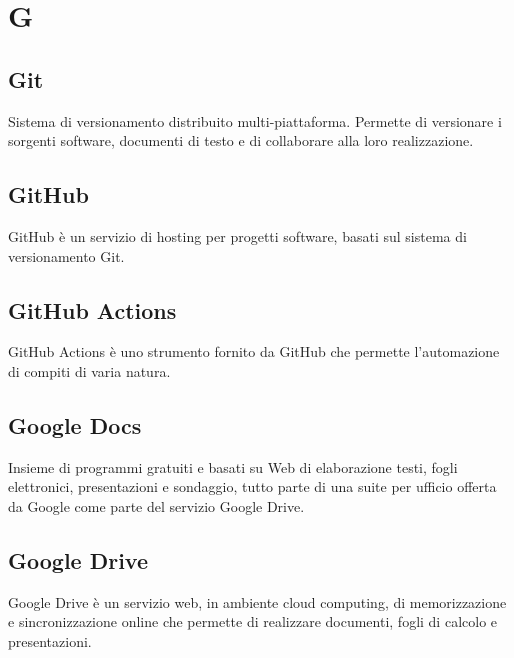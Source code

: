 \section{G}
	\subsection{Git}  
		Sistema di versionamento distribuito multi-piattaforma. Permette di versionare i sorgenti software, documenti di testo e di collaborare alla loro realizzazione.
	\subsection{GitHub}  
		GitHub è un servizio di hosting per progetti software, basati sul sistema di versionamento Git.
	\subsection{GitHub Actions}  
		GitHub Actions è uno strumento fornito da GitHub che permette l'automazione di compiti di varia natura.
	\subsection{Google Docs}
		Insieme di programmi gratuiti e basati su Web di elaborazione testi, fogli elettronici, presentazioni e sondaggio, tutto parte di una suite per ufficio offerta da Google come parte del servizio Google Drive.
	\subsection{Google Drive}  
		Google Drive è un servizio web, in ambiente cloud computing, di memorizzazione e sincronizzazione online che permette di realizzare documenti, fogli di calcolo e presentazioni.



\newpage